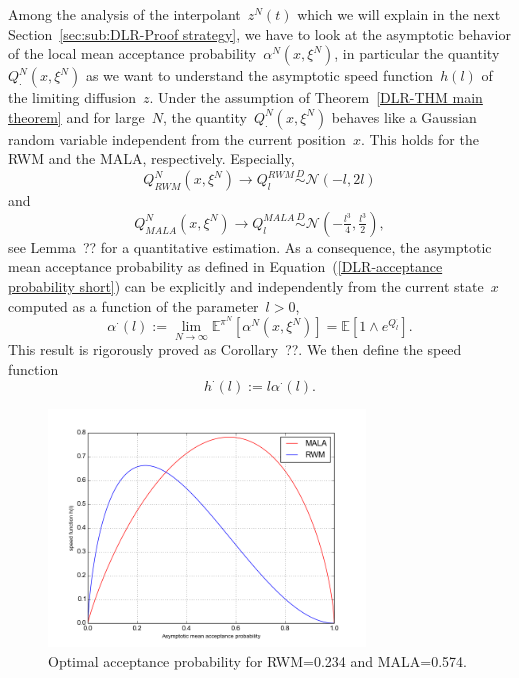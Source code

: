 Among the analysis of the interpolant~$z^N(t)$ which we will explain in the next Section~\ref{sec:sub:DLR-Proof strategy}, we have to look at the asymptotic behavior of the local mean acceptance probability~$\alpha^{N} (x, \xi^{N})$, in particular the quantity~$Q^{N}_{\cdot}(x, \xi^{N})$ as we want to understand the asymptotic speed function~$h(l)$ of the limiting diffusion~$z$. Under the assumption of Theorem~\ref{DLR-THM main theorem} and for large~$N$, the quantity~$Q^{N}_{\cdot}(x, \xi^{N})$ behaves like a Gaussian random variable independent from the current position~$x$. This holds for the RWM and the MALA, respectively. Especially, 
\begin{equation}
\label{DLR-Gaussian RWM short}
 Q^{N}_{RWM}(x, \xi^{N}) \to Q_l^{RWM} \stackrel{D}{\sim} \mathcal{N}(-l, 2l)
\end{equation}
and
\begin{equation}
\label{DLR-Gaussian MALA short}
 Q^{N}_{MALA}(x, \xi^{N}) \to Q_l^{MALA} \stackrel{D}{\sim} \mathcal{N}(-\tfrac{l^3}{4}, \tfrac{l^3}{2}),
\end{equation}
see Lemma~?? for a quantitative estimation.  As a consequence, the asymptotic mean acceptance probability as defined in Equation~(\ref{DLR-acceptance probability short}) can be explicitly and independently from the current state~$x$ computed as a function of the parameter~$l>0$,
\begin{equation}
\label{DLR-asymptotic mean acceptance probability}
 \alpha^{\cdot}(l) := \lim_{N \to \infty}  \mathbb{E}^{\pi^N} \left[ \alpha^N(x, \xi^N) \right] = \mathbb{E} \left[ 1 \wedge e^{Q_l^{\cdot}} \right].
\end{equation}
This result is rigorously proved as Corollary~??. We then define the speed function
\begin{equation}
 h^{\cdot}(l) := l \alpha^{\cdot}(l).
\end{equation}

\begin{figure}[htb]
 \begin{center} 
  \includegraphics[width=0.75\textwidth]{speedmeasures}
 \end{center}
  \caption{Optimal acceptance probability for RWM=0.234 and MALA=0.574.}
  \label{fig:optimal acceptance probability}
\end{figure}

